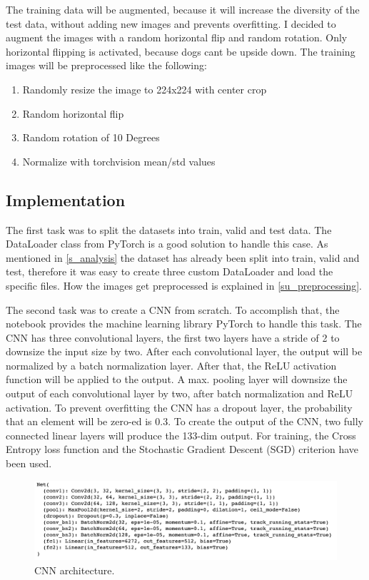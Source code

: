 \documentclass{article}
\begin{document}
The training data will be augmented, because it will increase the diversity of the test data, without adding new images and prevents overfitting. I decided to augment the images with a random horizontal flip and random rotation. Only horizontal flipping is activated, because dogs cant be upside down. The training images will be preprocessed like the following:
\begin{enumerate}
	\item Randomly resize the image to 224x224 with center crop
	\item Random horizontal flip
	\item Random rotation of 10 Degrees
	\item Normalize with torchvision mean/std values
\end{enumerate}

\subsection{Implementation} \label{su_implementation}
The first task  was to split the datasets into train, valid and test data. The DataLoader class from PyTorch is a good solution to handle this case. As mentioned in \ref{s_analysis} the dataset has already been split into train, valid and test, therefore it was easy to create three custom DataLoader and load the specific files. How the images get preprocessed is explained in \ref{su_preprocessing}.\newline

The second task was to create a CNN from scratch. To accomplish that, the notebook provides the machine learning library PyTorch to handle this task.\newline
The CNN has three convolutional layers, the first two layers have a stride of 2 to downsize the input size by two. After each convolutional layer, the output will be normalized by a batch normalization layer. After that, the ReLU activation function will be applied to the output. A max. pooling layer will downsize the output of each convolutional layer by two, after batch normalization and ReLU activation. To prevent overfitting the CNN has a dropout layer, the probability that an element will be zero-ed is 0.3. To create the output of the CNN, two fully connected linear layers will produce the 133-dim output.\newline
For training, the Cross Entropy loss function and the Stochastic Gradient Descent (SGD) criterion have been used.
\begin{figure}[h]
    \centering
    \includegraphics[scale=0.45]{./images/model_scratch_architecture}
    \caption{CNN architecture.}
    \label{fig:scratch_network_architecture}
\end{figure}
\end{document}
